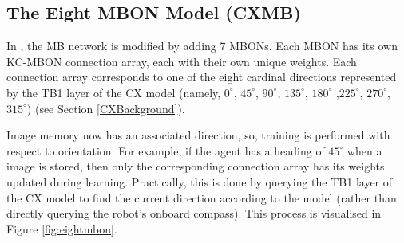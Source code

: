 \documentclass[a4paper,11pt,twoside,openright]{article}
\begin{document}
\subsection{ The Eight MBON Model (CXMB) } \label{CXMBBackground}
In \cite{Zhang2017}, the MB network is modified by adding 7 MBONs. Each MBON has
its own KC-MBON connection array, each with their own unique weights. Each
connection array corresponds to one of the eight cardinal directions represented
by the TB1 layer of the CX model (namely, $0^{\circ}$, $45^{\circ}$, $90^{\circ}$,
$135^{\circ}$, $180^{\circ}$ ,$225^{\circ}$, $270^{\circ}$, $315^{\circ}$) (see
Section \ref{CXBackground}).
\newline
\par

Image memory now has an associated direction, so, training is performed with
respect to orientation. For example, if the agent has a heading of $45^{\circ}$
when a image is stored, then only the corresponding connection array has its
weights updated during learning. Practically, this is done by querying the TB1
layer of the CX model to find the current direction according to the model
(rather than directly querying the robot's onboard compass). This process is
visualised in Figure \ref{fig:eightmbon}.
\newline
\par
\end{document}
